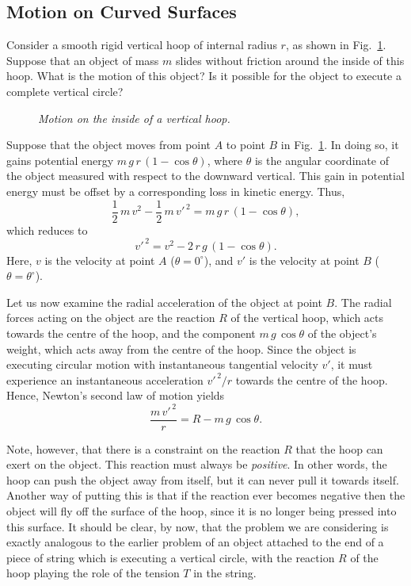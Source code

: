 \subsection{Motion on Curved Surfaces}
Consider a smooth rigid vertical hoop of internal radius $r$, as shown in Fig.~\ref{f66}.
Suppose that an object of mass $m$ slides without friction around the inside of this hoop.
What is the motion of this object? Is it possible for the object to execute a complete
vertical circle?

\begin{figure}
\epsfysize=3in
\centerline{}
\caption{\em Motion on the inside of a vertical hoop.}\label{f66}  
\end{figure}

 Suppose that the object moves from point $A$ to
point $B$ in Fig.~\ref{f66}.  In doing so, it gains potential energy $m\,g\,r\,(1-\cos\theta)$,
where $\theta$ is the angular coordinate of the object measured with
respect to the downward vertical. This gain
in potential energy must be offset by a corresponding loss in kinetic energy. Thus,
\begin{equation}
\frac{1}{2}\,m\,v^2 - \frac{1}{2}\,m\,{v'}^{\,2} = m\,g\,r\,(1-\cos\theta),
\end{equation}
which reduces to
\begin{equation}\label{e747a}
{v'}^{\,2} = v^2 - 2\,r\,g\,(1-\cos\theta).
\end{equation}
Here, $v$ is the velocity at point $A$ ($\theta=0^\circ$), and $v'$ is the velocity
at point $B$ ($\theta =\theta^\circ$). 

Let us now examine the radial acceleration of the object at point $B$. The radial forces
acting on the object are the reaction $R$ of the vertical hoop, which acts towards
the centre of the hoop, and the component $m\,g\,\cos\theta$ of the object's weight,
which acts away from the centre of the hoop. Since the object is executing
circular motion with instantaneous tangential velocity $v'$, it must experience
an instantaneous acceleration ${v'}^{\,2}/r$ towards the centre of the hoop. Hence,
Newton's second law of motion yields
\begin{equation}\label{e748a}
\frac{m\,{v'}^{\,2}}{r} = R - m\,g\,\cos\theta.
\end{equation}

Note, however, that there is a constraint on the reaction $R$ that the hoop
can exert on the object. This reaction must always be {\em positive}. In other
words, the hoop can push the object away from itself, but it can never pull
it towards itself. Another way of putting this is that if the reaction ever becomes
negative then the object will fly off the surface of the hoop, since it is no longer
being pressed into this surface. It should be clear, by now, that the problem
we are considering is exactly analogous to the earlier problem of an object attached to the end
of a piece of string which is executing a vertical circle, with the reaction $R$ of the
hoop playing the role of the tension $T$ in the string.

